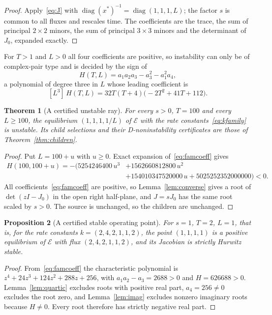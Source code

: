 \documentclass[11pt,a4paper]{article}
\theoremstyle{plain}
\newtheorem{theorem}{Theorem}[section]
\newtheorem{proposition}[theorem]{Proposition}
\theoremstyle{definition}
\theoremstyle{remark}
\newcommand{\diag}{\operatorname{diag}}
\newcommand{\xs}{x^{*}}
\begin{document}
\begin{proof}
Apply~\eqref{eq:J} with $\diag(\xs)^{-1}=\diag(1,1,1,L)$; the factor $s$ is common to all fluxes and rescales time. The coefficients are the trace, the sum of principal $2\times2$ minors, the sum of principal $3\times3$ minors and the determinant of $J_0$, expanded exactly.
\end{proof}

For $T>1$ and $L>0$ all four coefficients are positive, so instability can only be of complex-pair type and is decided by the sign of
\[
H(T,L)=a_1a_2a_3-a_3^2-a_1^2a_4 ,
\]
a polynomial of degree three in $L$ whose leading coefficient is
\begin{equation}\label{eq:leading}
[L^3]\,H(T,L)=32T(T+4)\bigl(-2T^2+41T+112\bigr).
\end{equation}

\begin{theorem}[A certified unstable ray]\label{thm:ray}
For every $s>0$, $T=100$ and every $L\ge100$, the equilibrium $(1,1,1,1/L)$ of $\mathcal E$ with the rate constants~\eqref{eq:kfamily} is unstable. Its child selections and their D-noninstability certificates are those of Theorem~\ref{thm:children}.
\end{theorem}

\begin{proof}
Put $L=100+u$ with $u\ge0$. Exact expansion of~\eqref{eq:famcoeff} gives
\begin{equation}\label{eq:Hu}
\begin{split}
H(100,100+u)=-\bigl(5254246400\,u^3&+1562660812800\,u^2\\
&+154010347520000\,u+5025252352000000\bigr)<0 .
\end{split}
\end{equation}
All coefficients~\eqref{eq:famcoeff} are positive, so Lemma~\ref{lem:converse} gives a root of $\det(zI-J_0)$ in the open right half-plane, and $J=sJ_0$ has the same root scaled by $s>0$. The source is unchanged, so the children are unchanged.
\end{proof}

\begin{proposition}[A certified stable operating point]\label{prop:stable}
For $s=1$, $T=2$, $L=1$, that is, for the rate constants $k=(2,4,2,1,1,2)$, the point $(1,1,1,1)$ is a positive equilibrium of $\mathcal E$ with flux $(2,4,2,1,1,2)$, and its Jacobian is strictly Hurwitz stable.
\end{proposition}

\begin{proof}
From~\eqref{eq:famcoeff} the characteristic polynomial is $z^4+24z^3+124z^2+288z+256$, with $a_1a_2-a_3=2688>0$ and $H=626688>0$. Lemma~\ref{lem:quartic} excludes roots with positive real part, $a_4=256\ne0$ excludes the root zero, and Lemma~\ref{lem:imag} excludes nonzero imaginary roots because $H\ne0$. Every root therefore has strictly negative real part.
\end{proof}
\end{document}
